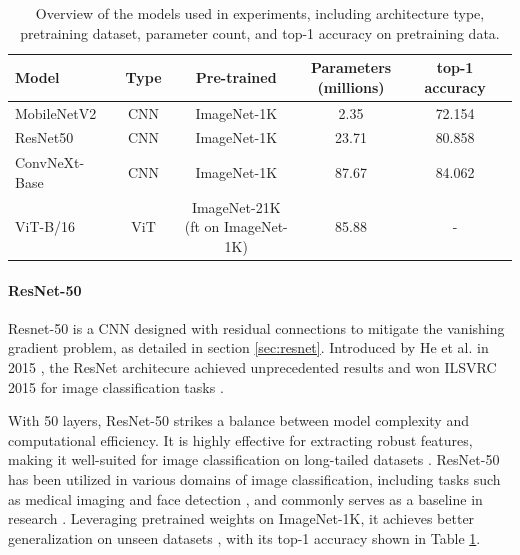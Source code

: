 \begin{table}[ht]
    \centering
    \caption{Overview of the models used in experiments, including architecture type, pretraining dataset, parameter count, and top-1 accuracy on pretraining data.}
    \small
    \begin{tabular}{lcccc}
    \toprule
    \textbf{Model} & \textbf{Type} & \textbf{Pre-trained} & \makecell{\textbf{Parameters} \\ \textbf{(millions)}} & \textbf{top-1 accuracy} \\
    \midrule
    MobileNetV2 \cite{sandler2018mobilenetv2} & CNN  & ImageNet-1K & 2.35 & 72.154 \cite{pytorch_mobilenetv2} \\
    ResNet50 \cite{he2015deepresiduallearningimage} & CNN & ImageNet-1K & 23.71 & 	
    80.858 \cite{pytorchresnet} \\
    ConvNeXt-Base \cite{pytorch-convnext}  & CNN & ImageNet-1K & 87.67 & 84.062 \cite{torchvision-resnet} \\
    ViT-B/16 \cite{dosovitskiy2021imageworth16x16words}   & ViT & \makecell{ImageNet-21K \\ (ft on ImageNet-1K)} & 85.88 & 	- \\
    \bottomrule
    \end{tabular}
    \label{tab:model_performance}
\end{table}



\paragraph{ResNet-50}
Resnet-50 is a CNN designed with residual connections to mitigate the vanishing gradient problem, as detailed in section \ref{sec:resnet}. Introduced by He et al. in 2015 \cite{he2015deepresiduallearningimage}, the ResNet architecure achieved unprecedented results and won ILSVRC 2015 for image classification tasks \cite{ILSVRC15}. 

With 50 layers, ResNet-50 strikes a balance between model complexity and computational efficiency. It is highly effective for extracting robust features, making it well-suited for image classification on long-tailed datasets \cite{he2015deepresiduallearningimage}. ResNet-50 has been utilized in various domains of image classification, including tasks such as medical imaging \cite{huang2022identifyingkeycomponentsresnet50, Simegn} and face detection \cite{Nyarko2022}, and commonly serves as a baseline in research \cite{yun2019cutmixregularizationstrategytrain,cubuk2019randaugmentpracticalautomateddata,zhang2018mixupempiricalriskminimization,menon2021longtaillearninglogitadjustment}. Leveraging pretrained weights on ImageNet-1K, it achieves better generalization on unseen datasets \cite{resnettransfer,RAZAVI2024123276,chan2019transfer,Shafiq2022}, with its top-1 accuracy shown in Table \ref{tab:model_performance}. 

